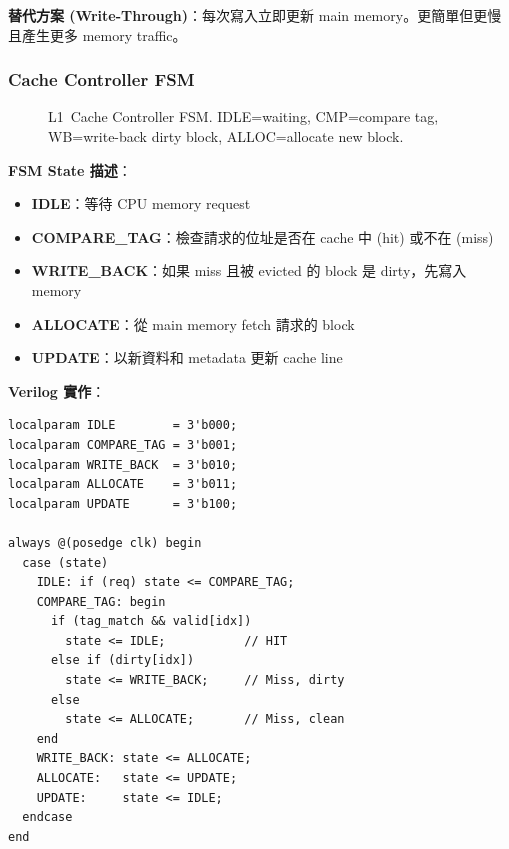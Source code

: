 \documentclass[journal]{IEEEtran}
\begin{document}
\textbf{替代方案 (Write-Through)}：每次寫入立即更新 main memory。更簡單但更慢且產生更多 memory traffic。

\subsubsection{Cache Controller FSM}
\begin{figure}[!t]
\centering
{}
\caption{L1~Cache Controller FSM. IDLE=waiting, CMP=compare tag, WB=write-back dirty block, ALLOC=allocate new block.}
\label{fig:cache}
\end{figure}

\textbf{FSM State 描述}：
\begin{itemize}
    \item \textbf{IDLE}：等待 CPU memory request
    \item \textbf{COMPARE\_TAG}：檢查請求的位址是否在 cache 中 (hit) 或不在 (miss)
    \item \textbf{WRITE\_BACK}：如果 miss 且被 evicted 的 block 是 dirty，先寫入 memory
    \item \textbf{ALLOCATE}：從 main memory fetch 請求的 block
    \item \textbf{UPDATE}：以新資料和 metadata 更新 cache line
\end{itemize}

\textbf{Verilog 實作}：
\begin{lstlisting}
localparam IDLE        = 3'b000;
localparam COMPARE_TAG = 3'b001;
localparam WRITE_BACK  = 3'b010;
localparam ALLOCATE    = 3'b011;
localparam UPDATE      = 3'b100;

always @(posedge clk) begin
  case (state)
    IDLE: if (req) state <= COMPARE_TAG;
    COMPARE_TAG: begin
      if (tag_match && valid[idx]) 
        state <= IDLE;           // HIT
      else if (dirty[idx]) 
        state <= WRITE_BACK;     // Miss, dirty
      else 
        state <= ALLOCATE;       // Miss, clean
    end
    WRITE_BACK: state <= ALLOCATE;
    ALLOCATE:   state <= UPDATE;
    UPDATE:     state <= IDLE;
  endcase
end
\end{lstlisting}
\end{document}
